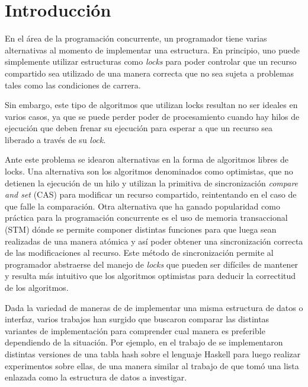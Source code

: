 \chapter{Introducción}

En el área de la programación concurrente, un programador tiene varias alternativas al momento de implementar una estructura. En principio, uno puede simplemente utilizar estructuras como \emph{locks} para poder controlar que un recurso compartido sea utilizado de una manera correcta que no sea sujeta a problemas tales como las condiciones de carrera.

Sin embargo, este tipo de algoritmos que utilizan locks resultan no ser ideales en varios casos, ya que se puede perder poder de procesamiento cuando hay hilos de ejecución que deben frenar su ejecución para esperar a que un recurso sea liberado a través de su \emph{lock}.

Ante este problema se idearon alternativas en la forma de algoritmos libres de locks. Una alternativa son los algoritmos denominados como optimistas, que no detienen la ejecución de un hilo y utilizan la primitiva de sincronización \emph{compare and set} (CAS) para modificar un recurso compartido, reintentando en el caso de que falle la comparación. Otra alternativa que ha ganado popularidad como práctica para la programación concurrente es el uso de memoria transaccional (STM) dónde se permite componer distintas funciones para que luega sean realizadas de una manera atómica y así poder obtener una sincronización correcta de las modificaciones al recurso.
Este método de sincronización permite al programador abstraerse del manejo de \emph{locks} que pueden ser difíciles de mantener y resulta más intuitivo que los algoritmos optimistas para deducir la correctitud de los algoritmos.

Dada la variedad de maneras de de implementar una misma estructura de datos o interfaz, varios trabajos han surgido que buscaron comparar las distintas variantes de implementación para comprender cual manera es preferible dependiendo de la situación. Por ejemplo, en el trabajo de \cite{hash} se implementaron distintas versiones de una tabla hash sobre el lenguaje Haskell para luego realizar experimentos sobre ellas, de una manera similar al trabajo de \cite{linked-list} que tomó una lista enlazada como la estructura de datos a investigar.

